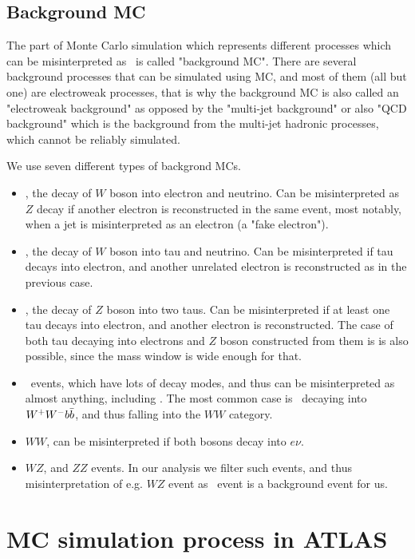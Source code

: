 \subsection{Background MC}

The part of Monte Carlo simulation which represents different processes which can be misinterpreted as \Zee\ is called "background MC". There are several background processes that can be simulated using MC, and most of them (all but one) are electroweak processes, that is why the background MC is also called an "electroweak background" as opposed by the "multi-jet background" or also "QCD background" which is the background from the multi-jet hadronic processes, which cannot be reliably simulated.

We use seven different types of backgrond MCs.
\begin{itemize}
\item \Wenu, the decay of $W$ boson into electron and neutrino. Can be misinterpreted as $Z$ decay if another electron is reconstructed in the same event, most notably, when a jet is misinterpreted as an electron (a "fake electron").
\item \Wtau, the decay of $W$ boson into tau and neutrino. Can be misinterpreted if tau decays into electron, and another unrelated electron is reconstructed as in the previous case.
\item \Ztau, the decay of $Z$ boson into two taus. Can be misinterpreted if at least one tau decays into electron, and another electron is reconstructed. The case of both tau decaying into electrons and $Z$ boson constructed from them is is also possible, since the mass window is wide enough for that.
\item \ttbar\ events, which have lots of decay modes, and thus can be misinterpreted as almost anything, including \Zee. The most common case is \ttbar\ decaying into $W^{+}W^{-}b\bar{b}$, and thus falling into the $WW$ category.
\item $WW$, can be misinterpreted if both bosons decay into $e\nu$.
\item $WZ$, and $ZZ$ events. In our analysis we filter such events, and thus misinterpretation of e.g. $WZ$ event as \Zee\ event is a background event for us.
\end{itemize}

\section{MC simulation process in ATLAS}
\label{sec:MC_sim}

